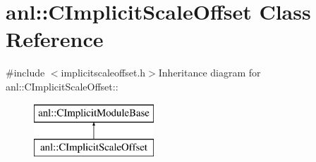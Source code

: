 \hypertarget{classanl_1_1CImplicitScaleOffset}{
\section{anl::CImplicitScaleOffset Class Reference}
\label{classanl_1_1CImplicitScaleOffset}
}


{\ttfamily \#include $<$implicitscaleoffset.h$>$}Inheritance diagram for anl::CImplicitScaleOffset::\begin{figure}[H]
\begin{center}
\leavevmode
\includegraphics[height=2cm]{classanl_1_1CImplicitScaleOffset}
\end{center}
\end{figure}
